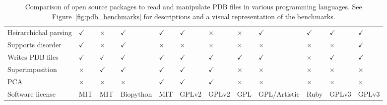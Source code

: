 \begin{table}
\begin{footnotesize}
\begin{tabular}{ l p{1.2cm} p{1.2cm} p{1.5cm} p{1.2cm} p{1.7cm} p{1.2cm} p{1.2cm} p{1.2cm} p{1.2cm} p{1.2cm} p{1.2cm} }
Heirarchichal parsing & $\checkmark$      & $\times$       & $\checkmark$       & $\checkmark$   & $\checkmark$        & $\times$       & $\times$      & $\checkmark$          & $\checkmark$     & $\checkmark$    & $\checkmark$   \\
Supports disorder     & $\checkmark$      & $\times$       & $\checkmark$       & $\times$       & $\times$            & $\times$       & $\times$      & $\times$              & $\times$         & $\times$        & $\checkmark$   \\
Writes PDB files      & $\checkmark$      & $\checkmark$   & $\checkmark$       & $\checkmark$   & $\checkmark$        & $\checkmark$   & $\checkmark$  & $\checkmark$          & $\times$         & $\checkmark$    & $\checkmark$   \\
Superimposition       & $\times$          & $\checkmark$   & $\checkmark$       & $\checkmark$   & $\checkmark$        & $\checkmark$   & $\times$      & $\times$              & $\times$         & $\times$        & $\times$       \\
PCA                   & $\times$          & $\times$       & $\times$           & $\checkmark$   & $\checkmark$        & $\checkmark$   & $\times$      & $\times$              & $\times$         & $\times$        & $\times$       \\
Software license      & MIT               & MIT            & Biopython          & MIT            & GPLv2               & GPLv2          & GPL           & GPL/\newline Artistic & Ruby             & GPLv3           & GPLv3          \\
\hline
\end{tabular}
\end{footnotesize}

\caption[Comparison of open source packages to read and manipulate PDB files in various programming languages]
{Comparison of open source packages to read and manipulate PDB files in various programming languages.
See Figure~\ref{fig:pdb_benchmarks} for descriptions and a visual representation of the benchmarks.}

\label{tab:package_comparison}
\end{table}


